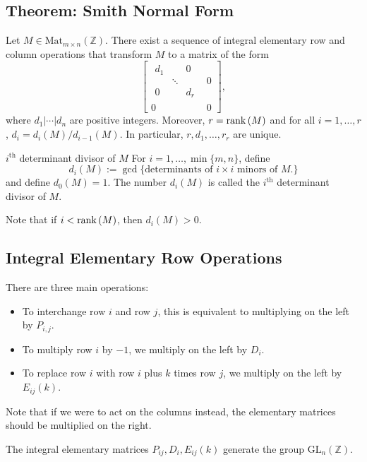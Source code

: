 \documentclass{article}
\begin{document}
\subsection{Theorem: Smith Normal Form}
\begin{idea}
    Let $M \in \text{Mat}_{m\times n}(\mathbb{Z})$. There exist a sequence of integral elementary row and column operations that transform $M$ to a matrix of the form
    \begin{equation}
        \left[
        \begin{array}{c|c}
            \begin{array}{ccc}
                d_1 &        & 0   \\
                    & \ddots &     \\
                0   &        & d_r
            \end{array} & 0 \\
            \hline
            0                          & 0
        \end{array}
        \right],
    \end{equation}
    where $d_1|\cdots|d_n$ are positive integers. Moreover, $r=\mathrm{rank}\,(M)$ and for all $i=1,\dots,r$, $d_i=d_i(M)/d_{i-1}(M)$. In particular, $r,d_1,\dots,r_r$ are unique.
\end{idea}
\begin{definition}{$i^\text{th}$ determinant divisor of $M$}
    For $i=1,\dots,\min\{m,n\}$, define
    \begin{equation}
        d_i(M) := \gcd\{\text{determinants of $i\times i$ minors of $M$.}\}
    \end{equation}
    and define $d_0(M)=1$. The number $d_i(M)$ is called the $i^\text{th}$ determinant divisor of $M$.
\end{definition}
Note that if $i < \mathrm{rank}\,(M)$, then $d_i(M) > 0$.
\subsection{Integral Elementary Row Operations}
There are three main operations:
\begin{itemize}
    \item To interchange row $i$ and row $j$, this is equivalent to multiplying on the left by $P_{i,j}$.
    \item To multiply row $i$ by $-1$, we multiply on the left by $D_i$.
    \item To replace row $i$ with row $i$ plus $k$ times row $j$, we multiply on the left by $E_{ij}(k)$.
\end{itemize}
Note that if we were to act on the columns instead, the elementary matrices should be multiplied on the right.
\begin{idea}
    The integral elementary matrices $P_{ij},D_i,E_{ij}(k)$ generate the group $\text{GL}_n(\mathbb{Z})$.
\end{idea}
\end{document}
